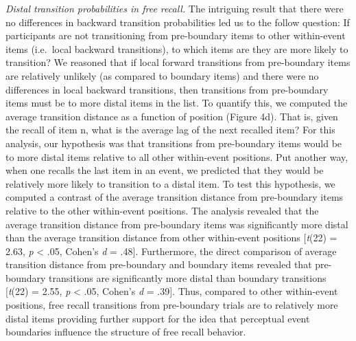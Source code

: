 \emph{Distal transition probabilities in free recall.} The intriguing
result that there were no differences in backward transition
probabilities led us to the follow question: If participants are not
transitioning from pre-boundary items to other within-event items
(i.e.~local backward transitions), to which items are they are more
likely to transition? We reasoned that if local forward transitions from
pre-boundary items are relatively unlikely (as compared to boundary
items) and there were no differences in local backward transitions, then
transitions from pre-boundary items must be to more distal items in the
list. To quantify this, we computed the average transition distance as a
function of position (Figure 4d). That is, given the recall of item n,
what is the average lag of the next recalled item? For this analysis,
our hypothesis was that transitions from pre-boundary items would be to
more distal items relative to all other within-event positions. Put
another way, when one recalls the last item in an event, we predicted
that they would be relatively more likely to transition to a distal
item. To test this hypothesis, we computed a contrast of the average
transition distance from pre-boundary items relative to the other
within-event positions. The analysis revealed that the average
transition distance from pre-boundary items was significantly more
distal than the average transition distance from other within-event
positions {[}\emph{t}(22) = 2.63, \emph{p} \textless{} .05, Cohen's
\emph{d} = .48{]}. Furthermore, the direct comparison of average
transition distance from pre-boundary and boundary items revealed that
pre-boundary transitions are significantly more distal than boundary
transitions {[}\emph{t}(22) = 2.55, \emph{p} \textless{} .05, Cohen's
\emph{d} = .39{]}. Thus, compared to other within-event positions, free
recall transitions from pre-boundary trials are to relatively more
distal items providing further support for the idea that perceptual
event boundaries influence the structure of free recall behavior.

